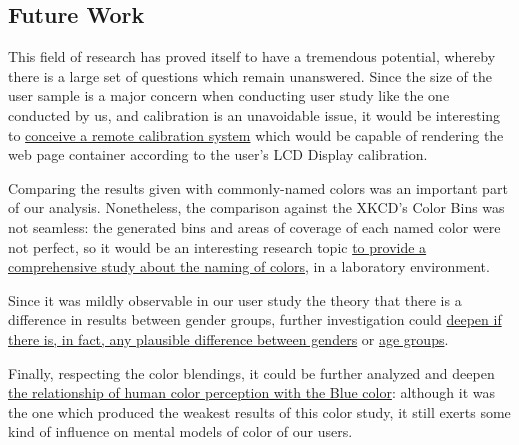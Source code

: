\subsection{Future Work}
%
This field of research has proved itself to have a tremendous potential, whereby there is a
large set of questions which remain unanswered. Since the size of the user sample is a major
concern when conducting user study like the one conducted by us, and calibration is an unavoidable
issue, it would be interesting to \ul{conceive a remote calibration system} which would be capable
of rendering the web page container according to the user's LCD Display calibration. \par
%
Comparing the results given with commonly-named colors was an important part of our analysis.
Nonetheless, the comparison against the XKCD's Color Bins was not seamless: the generated bins and
areas of coverage of each named color were not perfect, so it would be an interesting research topic
\ul{to provide a comprehensive study about the naming of colors}, in a laboratory environment. \par
%
Since it was mildly observable in our user study the theory that there is a difference in results
between gender groups, further investigation could \ul{deepen if there is, in fact, any plausible
difference between genders} or \ul{age groups}. \par
%
Finally, respecting the color blendings, it could be further analyzed and deepen \ul{the
relationship of human color perception with the Blue color}: although it was the one which
produced the weakest results of this color study, it still exerts some kind of influence on
mental models of color of our users. \par
